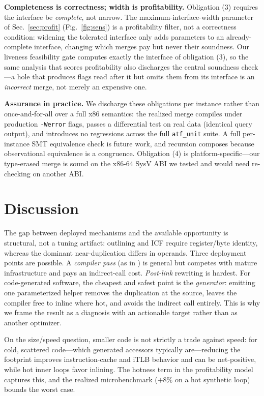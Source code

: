 \documentclass[conference]{IEEEtran}
\begin{document}
\textbf{Completeness is correctness; width is profitability.} Obligation (3)
requires the interface be \emph{complete}, not narrow. The
maximum-interface-width parameter of Sec.~\ref{sec:profit}
(Fig.~\ref{fig:sens}) is a profitability filter, not a correctness condition:
widening the tolerated interface only adds parameters to an already-complete
interface, changing which merges pay but never their soundness. Our liveness
feasibility gate computes exactly the interface of obligation (3), so the same
analysis that scores profitability also discharges the central soundness
check---a hole that produces flags read after it but omits them from its
interface is an \emph{incorrect} merge, not merely an expensive one.

\textbf{Assurance in practice.} We discharge these obligations per instance
rather than once-and-for-all over a full x86 semantics: the realized merge
compiles under production \texttt{-Werror} flags, passes a differential test
on real data (identical query output), and introduces no regressions across the
full \texttt{atf\_unit} suite. A full per-instance SMT equivalence
check \cite{lee2018alive2} is future work, and recursion composes because
observational equivalence is a congruence. Obligation (4) is
platform-specific---our type-erased merge is sound on the x86-64 SysV ABI we
tested and would need re-checking on another ABI.

\section{Discussion}
The gap between deployed mechanisms and the available opportunity is
structural, not a tuning artifact: outlining and ICF require register/byte
identity, whereas the dominant near-duplication differs in operands. Three
deployment points are possible. A \emph{compiler pass} (as in
\cite{rocha2019fmsa}) is general but competes with mature infrastructure and
pays an indirect-call cost. \emph{Post-link} rewriting is hardest. For
code-generated software, the cheapest and safest point is the
\emph{generator}: emitting one parameterized helper removes the duplication at
the source, leaves the compiler free to inline where hot, and avoids the
indirect call entirely. This is why we frame the result as a diagnosis with an
actionable target rather than as another optimizer.

On the size/speed question, smaller code is not strictly a trade against
speed: for cold, scattered code---which generated accessors typically
are---reducing the footprint improves instruction-cache and iTLB behavior and
can be net-positive, while hot inner loops favor inlining. The hotness term in
the profitability model captures this, and the realized microbenchmark
($+8\%$ on a hot synthetic loop) bounds the worst case.
\end{document}
